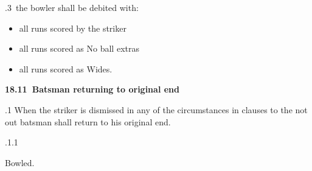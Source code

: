 \documentclass[12pt]{article}
\begin{document}
\vspace{\baselineskip}
{\fontsize{9pt}{10.8pt}.3\  the bowler shall be debited with:\par}\par


\vspace{\baselineskip}
\begin{itemize}
	\item {\fontsize{9pt}{10.8pt}\selectfont all runs scored by the striker\par}\par


\vspace{\baselineskip}
	\item {\fontsize{9pt}{10.8pt}\selectfont all runs scored as No ball extras\par}\par


\vspace{\baselineskip}
	\item {\fontsize{9pt}{10.8pt}\selectfont all runs scored as Wides.\par}
\end{itemize}\par


\vspace{\baselineskip}
{\fontsize{11pt}{13.2pt}\selectfont \textbf{18.11\  Batsman returning to original end}\par}\par


\vspace{\baselineskip}
\begin{adjustwidth}{0.5in}{0.32in}
{\fontsize{9pt}{10.8pt}.1 When the striker is dismissed in any of the circumstances in clauses to the not out batsman shall return to his original end.\par}\par

\end{adjustwidth}


\vspace{\baselineskip}
\begin{adjustwidth}{0.49in}{0.0in}
{\fontsize{9pt}{10.8pt}.1.1 \tabto{1.17in} {\fontsize{8pt}{9.6pt}\selectfont Bowled.\par}\par}\par

\end{adjustwidth}
\end{document}
